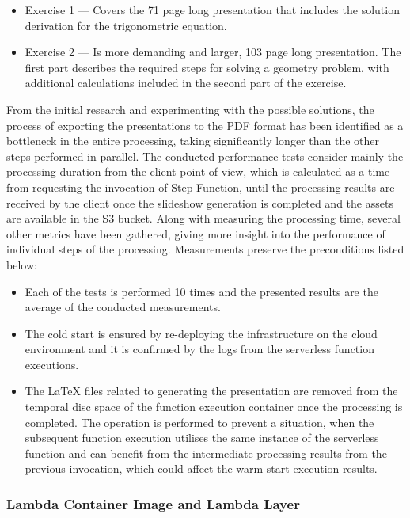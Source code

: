 \begin{itemize}
   \item Exercise 1 --- Covers the 71 page long presentation that includes the solution derivation for the trigonometric equation.
   \item Exercise 2 --- Is more demanding and larger, 103 page long presentation. The first part describes the required steps for solving a geometry problem, with additional calculations included in the second part of the exercise.
\end{itemize}

From the initial research and experimenting with the possible solutions, the process of exporting the presentations to the PDF format has been identified as a bottleneck in the entire processing, taking significantly longer than the other steps performed in parallel.
The conducted performance tests consider mainly the processing duration from the client point of view, which is calculated as a time from requesting the invocation of Step Function, until the processing results are received by the client once the slideshow generation is completed and the assets are available in the S3 bucket.
Along with measuring the processing time, several other metrics have been gathered, giving more insight into the performance of individual steps of the processing.
Measurements preserve the preconditions listed below:

\begin{itemize}
   \item Each of the tests is performed 10 times and the presented results are the average of the conducted measurements.
   \item The cold start is ensured by re-deploying the infrastructure on the cloud environment and it is confirmed by the logs from the serverless function executions.
   \item The LaTeX files related to generating the presentation are removed from the temporal disc space of the function execution container once the processing is completed.
   The operation is performed to prevent a situation, when the subsequent function execution utilises the same instance of the serverless function and can benefit from the intermediate processing results from the previous invocation, which could affect the warm start execution results.
\end{itemize}

\subsubsection{Lambda Container Image and Lambda Layer}

